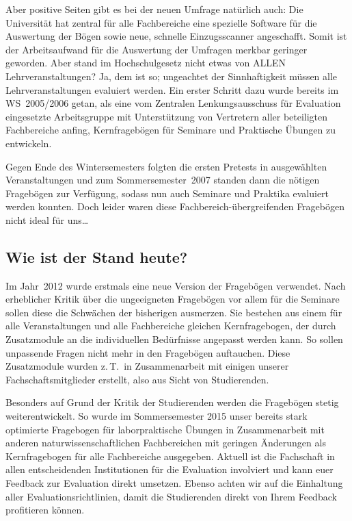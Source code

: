 \begin{multicols}{2}
Aber positive Seiten gibt es bei der neuen Umfrage natürlich auch: Die Universität hat zentral für alle Fachbereiche eine spezielle Software für die Auswertung der Bögen sowie neue, schnelle Einzugsscanner angeschafft. Somit ist der Arbeitsaufwand für die Auswertung der Umfragen merkbar geringer geworden. Aber stand im Hochschulgesetz nicht etwas von ALLEN Lehrveranstaltungen? Ja, dem ist so; ungeachtet der Sinnhaftigkeit müssen alle Lehrveranstaltungen evaluiert werden. Ein erster Schritt dazu wurde bereits im WS~2005/2006 getan, als eine vom Zentralen Lenkungsausschuss für Evaluation eingesetzte Arbeitsgruppe mit Unterstützung von Vertretern aller beteiligten Fachbereiche anfing, Kernfragebögen für Seminare und Praktische Übungen zu entwickeln.

Gegen Ende des Wintersemesters folgten die ersten Pretests in ausgewählten Veranstaltungen und zum Sommersemester~2007 standen dann die nötigen Fragebögen zur Verfügung, sodass nun auch Seminare und Praktika evaluiert werden konnten. Doch leider waren diese Fachbereich-übergreifenden Fragebögen nicht ideal für uns\dots

\vspace{-1.1em}
\subsection*{Wie ist der Stand heute?}
\vspace{-0.9em}
Im Jahr~2012 wurde erstmals eine neue Version der Fragebögen verwendet. Nach erheblicher Kritik über die ungeeigneten Fragebögen vor allem für die Seminare sollen diese die Schwächen der bisherigen ausmerzen. Sie bestehen aus einem für alle Veranstaltungen und alle Fachbereiche gleichen Kernfragebogen, der durch Zusatzmodule an die individuellen Bedürfnisse angepasst werden kann. So sollen unpassende Fragen nicht mehr in den Fragebögen auftauchen. Diese Zusatzmodule wurden z.\,T.\ in Zusammenarbeit mit einigen unserer Fachschaftsmitglieder erstellt, also aus Sicht von Studierenden.

Besonders auf Grund der Kritik der Studierenden werden die Fragebögen stetig weiterentwickelt. So wurde im Sommersemester 2015 unser bereits stark optimierte Fragebogen für laborpraktische Übungen in Zusammenarbeit mit anderen naturwissenschaftlichen Fachbereichen mit geringen Änderungen als Kernfragebogen für alle Fachbereiche ausgegeben. Aktuell ist die Fachschaft in allen entscheidenden Institutionen für die Evaluation involviert und kann euer Feedback zur Evaluation direkt umsetzen. Ebenso achten wir auf die Einhaltung aller Evaluationsrichtlinien, damit die Studierenden direkt von Ihrem Feedback profitieren können.


\end{multicols}
